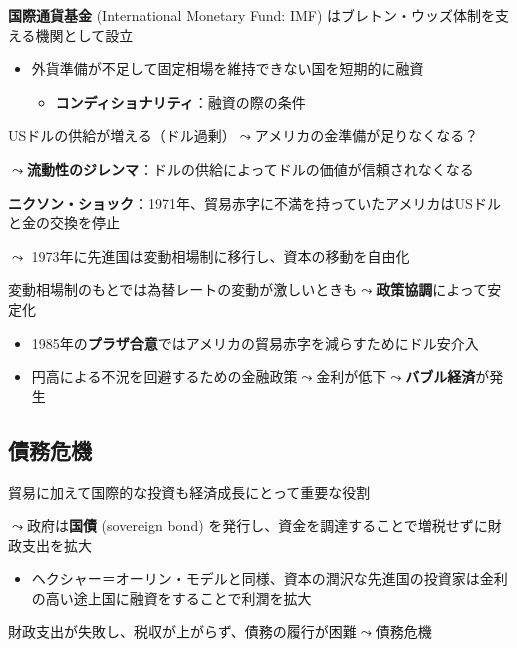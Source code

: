 \documentclass[
  xelatex,
  ja=standard]{bxjsarticle}
\providecommand{\tightlist}{%
  \setlength{\itemsep}{0pt}\setlength{\parskip}{0pt}}\usepackage{longtable,booktabs,array}
\begin{document}
\textbf{国際通貨基金} (International Monetary Fund: IMF)
はブレトン・ウッズ体制を支える機関として設立

\begin{itemize}
\tightlist
\item
  外貨準備が不足して固定相場を維持できない国を短期的に融資

  \begin{itemize}
  \tightlist
  \item
    \textbf{コンディショナリティ}：融資の際の条件
  \end{itemize}
\end{itemize}

USドルの供給が増える（ドル過剰）\(\leadsto\)アメリカの金準備が足りなくなる？

\(\leadsto\)\textbf{流動性のジレンマ}：ドルの供給によってドルの価値が信頼されなくなる

\textbf{ニクソン・ショック}：1971年、貿易赤字に不満を持っていたアメリカはUSドルと金の交換を停止

\(\leadsto\) 1973年に先進国は変動相場制に移行し、資本の移動を自由化

変動相場制のもとでは為替レートの変動が激しいときも\(\leadsto\)\textbf{政策協調}によって安定化

\begin{itemize}
\tightlist
\item
  1985年の\textbf{プラザ合意}ではアメリカの貿易赤字を減らすためにドル安介入
\item
  円高による不況を回避するための金融政策\(\leadsto\)金利が低下\(\leadsto\)\textbf{バブル経済}が発生
\end{itemize}

\hypertarget{ux50b5ux52d9ux5371ux6a5f}{%
\subsection{債務危機}\label{ux50b5ux52d9ux5371ux6a5f}}

貿易に加えて国際的な投資も経済成長にとって重要な役割

\(\leadsto\)政府は\textbf{国債} (sovereign bond)
を発行し、資金を調達することで増税せずに財政支出を拡大

\begin{itemize}
\tightlist
\item
  ヘクシャー＝オーリン・モデルと同様、資本の潤沢な先進国の投資家は金利の高い途上国に融資をすることで利潤を拡大
\end{itemize}

財政支出が失敗し、税収が上がらず、債務の履行が困難\(\leadsto\)債務危機
\end{document}
